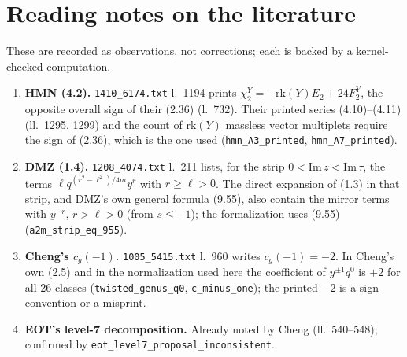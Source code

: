\documentclass[11pt,a4paper]{article}
\theoremstyle{remark}
\newcommand{\lean}[1]{\texttt{#1}}
\begin{document}
\section{Reading notes on the literature}
\label{sec:notes}
These are recorded as observations, not corrections; each is backed by a kernel-checked computation.
\begin{enumerate}
\item \textbf{HMN (4.2).} \texttt{1410\_6174.txt} l.~1194 prints $\chi_2^Y=-\mathrm{rk}(Y)E_2+24F_2^Y$,
the opposite overall sign of their (2.36) (l.~732). Their printed series (4.10)--(4.11) (ll.~1295, 1299)
and the count of $\mathrm{rk}(Y)$ massless vector multiplets require the sign of (2.36), which is the one
used (\lean{hmn\_A3\_printed}, \lean{hmn\_A7\_printed}).
\item \textbf{DMZ (1.4).} \texttt{1208\_4074.txt} l.~211 lists, for the strip $0<\mathrm{Im}\,z<\mathrm{Im}\,\tau$,
the terms $\ell q^{(r^2-\ell^2)/4m}y^r$ with $r\ge\ell>0$. The direct expansion of (1.3) in that strip, and
DMZ's own general formula (9.55), also contain the mirror terms with $y^{-r}$, $r>\ell>0$ (from $s\le-1$);
the formalization uses (9.55) (\lean{a2m\_strip\_eq\_955}).
\item \textbf{Cheng's $c_g(-1)$.} \texttt{1005\_5415.txt} l.~960 writes $c_g(-1)=-2$. In Cheng's own
(2.5) and in the normalization used here the coefficient of $y^{\pm1}q^0$ is $+2$ for all 26 classes
(\lean{twisted\_genus\_q0}, \lean{c\_minus\_one}); the printed $-2$ is a sign convention or a misprint.
\item \textbf{EOT's level-7 decomposition.} Already noted by Cheng (ll.~540--548); confirmed by
\lean{eot\_level7\_proposal\_inconsistent}.
\end{enumerate}

\end{document}
